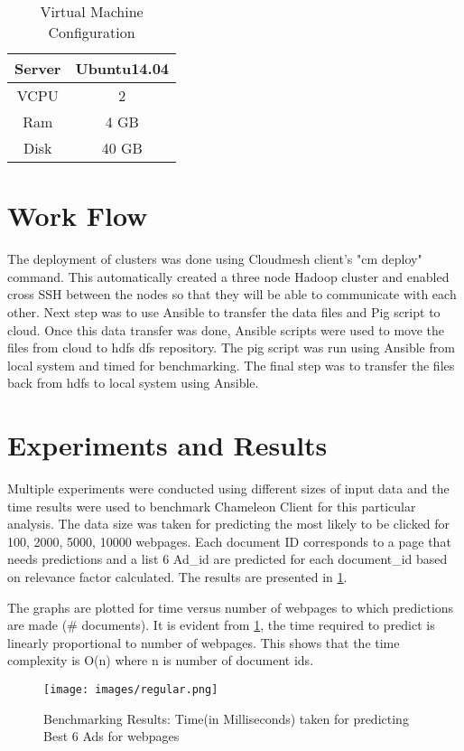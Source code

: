 \documentclass[9pt,twocolumn,twoside]{../../styles/osajnl}
\begin{document}
\begin{table}
\begin{tabular}{|c|c|}
\hline
    Server & Ubuntu14.04 \\ \hline
    VCPU & 2 \\\hline
    Ram & 4 GB \\\hline
    Disk & 40 GB\\\hline
\end{tabular}
\caption{Virtual Machine Configuration}
\end{table}
\section{Work Flow}

The deployment of clusters was done using Cloudmesh client's "cm deploy" command. This automatically created a three node Hadoop cluster and enabled cross SSH between the nodes so that they will be able to communicate with each other. Next step was to use Ansible to transfer the data files and Pig script to cloud. Once this data transfer was done, Ansible scripts were used to move the files from cloud to hdfs dfs repository. The pig script was run using Ansible from local system and timed for benchmarking. The final step was to transfer the files back from hdfs to local system using Ansible.

\section{Experiments and Results}
Multiple experiments were conducted using different sizes of input data and the time results were used to benchmark Chameleon Client for this particular analysis. The data size was taken for predicting the most likely to be clicked for 100, 2000, 5000, 10000 webpages. Each document ID corresponds to a page that needs predictions and a list 6 Ad\_id are predicted for each document\_id based on relevance factor calculated.
The results are presented in  \ref{fig:regular}.  

The graphs are plotted for time versus number of webpages to which predictions are made (\# documents). It is evident from \ref{fig:regular}, the time required to predict is linearly proportional to number of webpages. This shows that the time complexity is O(n) where n is number of document ids.


\begin{figure}[hptb]
\centering
\texttt{[image: images/regular.png]}
\caption{ Benchmarking Results: Time(in Milliseconds) taken for predicting Best 6 Ads for webpages}
\label{fig:regular}
\end{figure}
\end{document}
